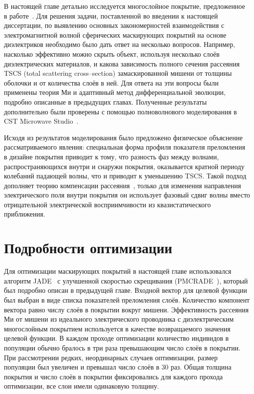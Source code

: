 В настоящей главе детально исследуется многослойное покрытие,
предложенное в работе~\cite{Semouchkina-2013}. Для решения задачи,
поставленной во введении к настоящей диссертации, по выявлению
основных закономерностей взаимодействия с электромагнитной волной
сферических маскирующих покрытий на основе диэлектриков необходимо
было дать ответ на несколько вопросов. Например, насколько эффективно
можно скрыть объект, используя несколько слоёв диэлектрических
материалов, и какова зависимость полного сечения рассеяния TSCS (total
scattering cross--section) замаскированной мишени от толщины оболочки и
от количества слоёв в ней. Для ответа на эти вопросы были применены теория Ми и
адаптивный метод дифференциальной эволюции, подробно описанные в
предыдущих главах. Полученные результаты дополнительно были проверены с
помощью полноволнового моделирования в CST Microwave
Studio~\cite{CST-web}.
 
Исходя из результатов моделирования было предложено физическое
объяснение рассматриваемого явления: специальная форма профиля
показателя преломления в дизайне покрытия приводит к тому, что
разность фаз между волнами, распространяющихся внутри и снаружи
покрытия, оказывается кратной периоду колебаний падающей волны, что и
приводит к уменьшению TSCS. Такой подход дополняет теорию компенсации
рассеяния~\cite{alu}, только для изменения направления электрического
поля внутри покрытия он использует фазовый сдвиг волны вместо
отрицательной электрической восприимчивости из квазистатического
приближения.

\section{Подробности оптимизации}
Для оптимизации маскирующих покрытий в настоящей главе использовался
алгоритм JADE~\cite{Jingqiao-JADE-2009} с улучшенной скоростью
скрещивания (PMCRADE~\cite{Li-PMCRADE-2011}), который был подробно
описан в предыдущей главе.  Входной вектор для целевой функции был
выбран в виде списка показателей преломления слоёв. Количество
компонент вектора равно числу слоёв в покрытии вокруг
мишени. Эффективность рассеяния Ми от мишени из идеального
электрического проводника с диэлектрическим многослойным покрытием
используется в качестве возвращаемого значения целевой функции. В
каждом проходе оптимизации количество индивидов в популяции обычно
бралось в три раза превышающим число слоёв в покрытии. При
рассмотрении редких, неординарных случаев оптимизации, размер
популяции был увеличен и превышал число слоёв в 30 раз. Общая толщина
покрытия и число слоёв в покрытии фиксировались для каждого прохода
оптимизации, все слои имели одинаковую толщину.
 

